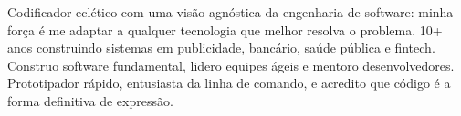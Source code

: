 %
%
%
\par{
Codificador eclético com uma visão agnóstica da engenharia de software: minha força é me adaptar a qualquer tecnologia que melhor resolva o problema. 10+ anos construindo sistemas em publicidade, bancário, saúde pública e fintech. Construo software fundamental, lidero equipes ágeis e mentoro desenvolvedores. Prototipador rápido, entusiasta da linha de comando, e acredito que código é a forma definitiva de expressão.

}